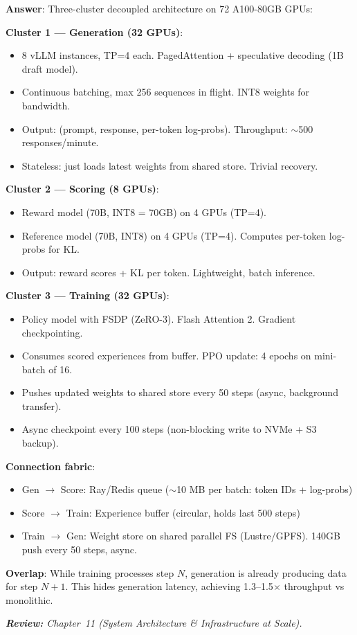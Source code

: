 \begin{questionbox}
\textbf{Answer}: Three-cluster decoupled architecture on 72 A100-80GB GPUs:

\textbf{Cluster 1 --- Generation (32 GPUs)}:

\begin{itemize}
  \item 8 vLLM instances, TP=4 each. PagedAttention + speculative decoding (1B draft model).
  \item Continuous batching, max 256 sequences in flight. INT8 weights for bandwidth.
  \item Output: (prompt, response, per-token log-probs). Throughput: $\sim$500 responses/minute.
  \item Stateless: just loads latest weights from shared store. Trivial recovery.
\end{itemize}

\textbf{Cluster 2 --- Scoring (8 GPUs)}:

\begin{itemize}
  \item Reward model (70B, INT8 = 70GB) on 4 GPUs (TP=4).
  \item Reference model (70B, INT8) on 4 GPUs (TP=4). Computes per-token log-probs for KL.
  \item Output: reward scores + KL per token. Lightweight, batch inference.
\end{itemize}

\textbf{Cluster 3 --- Training (32 GPUs)}:

\begin{itemize}
  \item Policy model with FSDP (ZeRO-3). Flash Attention 2. Gradient checkpointing.
  \item Consumes scored experiences from buffer. PPO update: 4 epochs on mini-batch of 16.
  \item Pushes updated weights to shared store every 50 steps (async, background transfer).
  \item Async checkpoint every 100 steps (non-blocking write to NVMe + S3 backup).
\end{itemize}

\textbf{Connection fabric}:

\begin{itemize}
  \item Gen $\rightarrow$ Score: Ray/Redis queue ($\sim$10 MB per batch: token IDs + log-probs)
  \item Score $\rightarrow$ Train: Experience buffer (circular, holds last 500 steps)
  \item Train $\rightarrow$ Gen: Weight store on shared parallel FS (Lustre/GPFS). 140GB push every 50 steps, async.
\end{itemize}

\textbf{Overlap}: While training processes step $N$, generation is already producing data for step $N+1$. This hides generation latency, achieving 1.3--1.5$\times$ throughput vs monolithic.

\emph{\textbf{Review:} Chapter~11 (System Architecture \& Infrastructure at Scale).}
\end{questionbox}

